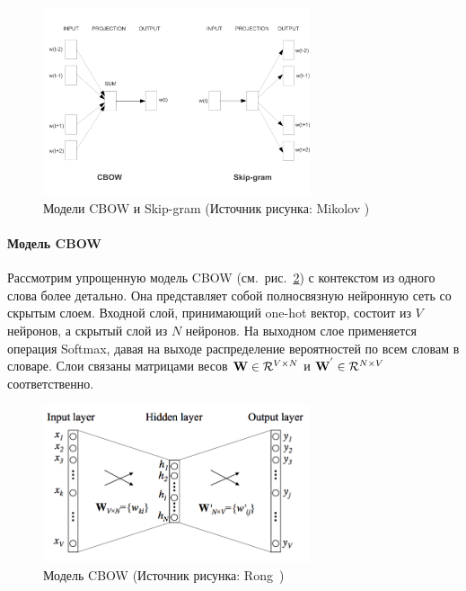 \begin{figure}[t]
\centering
\includegraphics[width=0.7\textwidth]{img/efficient-models}
\caption{\label{fig:w2v-models}Модели CBOW и Skip-gram (Источник рисунка: \hspace{\textwidth}Mikolov \autocite{DBLP:journals/corr/abs-1301-3781})}
\end{figure}

\paragraph{Модель CBOW} Рассмотрим упрощенную модель CBOW (см.~рис.~\ref{fig:w2v-cbow}) с контекстом из одного слова более детально. Она представляет собой полносвязную нейронную сеть со скрытым слоем. Входной слой, принимающий one-hot вектор, состоит из ${V}$ нейронов, а скрытый слой из ${N}$ нейронов. На выходном слое применяется операция Softmax, давая на выходе распределение вероятностей по всем словам в словаре. Слои связаны матрицами весов ${\textbf W} \in \mathcal{R}^{V \times N } $ и ${\textbf W^{'}} \in \mathcal{R}^{N \times V}$ соответственно.

\begin{figure}[t]
\centering
\includegraphics[width=0.7\textwidth]{img/CBOW.png}
\caption{\label{fig:w2v-cbow}Модель CBOW (Источник рисунка: Rong~\autocite{Rong2014word2vecPL})}
\end{figure}



